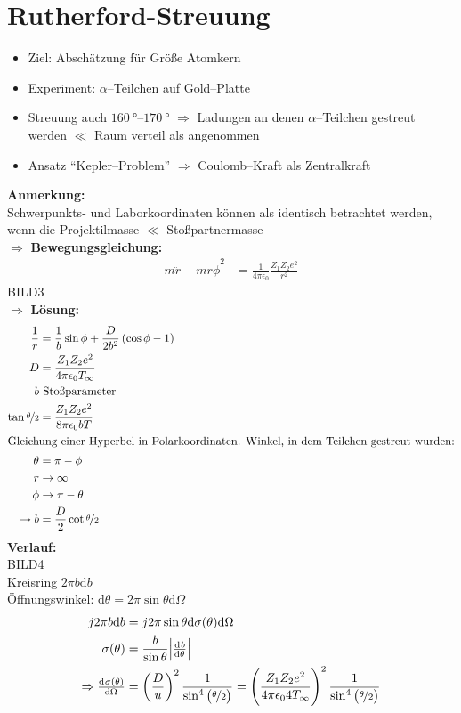 \documentclass[BCOR=5mm,DIV=calc,listof=totoc,headings=big]{scrartcl}
\newcommand{\de}{\mathrm{d}}
\begin{document}
\section{Rutherford-Streuung}
\label{sec:rutherford-streuung}
\begin{itemize}
\item Ziel: Abschätzung für Größe Atomkern
\item Experiment: $\alpha$--Teilchen auf Gold--Platte
\item Streuung auch $\SIrange{160}{170}{\degree}$ $\Rightarrow$
  Ladungen an denen $\alpha$--Teilchen gestreut werden $\ll$ Raum
  verteil als angenommen
\item Ansatz "`Kepler--Problem"' $\Rightarrow$ Coulomb--Kraft als Zentralkraft
\end{itemize}
\textbf{Anmerkung:}\\
Schwerpunkts- und Laborkoordinaten können als identisch betrachtet
werden, wenn die Projektilmasse $\ll$ Stoßpartnermasse\\
$\Rightarrow$ \textbf{Bewegungsgleichung:}
\begin{align*}
  m \ddot{r} - mr\dot{\phi}^{2}&=\frac{1}{4\pi\epsilon_{0}} \frac{Z_{1}Z_{2}e^{2}}{r^{2}}
\end{align*}
BILD3\\
$\Rightarrow$ \textbf{Lösung:}\\
\begin{align*}
  \frac{1}{r}&=\frac{1}{b}\sin\phi +
  \frac{D}{2b^{2}}\del{\cos\phi-1}\\
  D&=\frac{Z_{1}Z_{2}e^{2}}{4\pi\epsilon_{0}T_{\infty}}\\
  b&\text{ Stoßparameter}\\
  \tan{\nicefrac{\theta}{2}}&=\frac{Z_{1}Z_{2}e^{2}}{8\pi\epsilon_{0}bT}\\
  \intertext{Gleichung einer Hyperbel in Polarkoordinaten. Winkel, in
    dem Teilchen gestreut wurden:} \theta&=\pi-\phi\\
  r&\rightarrow \infty\\
  \phi&\rightarrow \pi-\theta\\
  \rightarrow b&=\frac{D}{2}\cot{\nicefrac{\theta}{2}}
\end{align*}
\textbf{Verlauf:}\\
BILD4\\
Kreisring $2\pi b \de b$\\
Öffnungswinkel: $\de \theta=2\pi \sin\theta \de \Omega$
\begin{align*}
  j 2\pi b \de b&=j2\pi \sin\theta \de \sigma (\theta) \de \Omega\\
  \sigma(\theta)&=\frac{b}{\sin\theta} \abs{\od{b}{\theta}}\\
  \Rightarrow \od{\sigma(\theta)}{\Omega}&=\del{\frac{D}{u}}^{2}
  \frac{1}{\sin^{4}\del{\nicefrac{\theta}{2}}}=\del{\frac{Z_{1}Z_{2}e^{2}}{4\pi\epsilon_{0}4
    T_{\infty}}}^{2} \frac{1}{\sin^{4}\del{\nicefrac{\theta}{2}}}
\end{align*}
\end{document}
